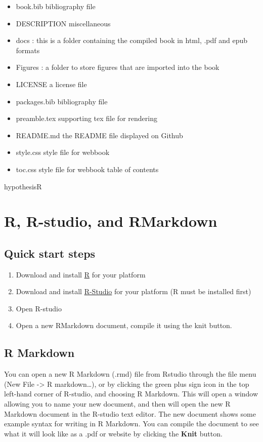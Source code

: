 \documentclass[]{book}
\providecommand{\tightlist}{%
  \setlength{\itemsep}{0pt}\setlength{\parskip}{0pt}}
\theoremstyle{definition}
\theoremstyle{definition}
\theoremstyle{definition}
\theoremstyle{remark}
\begin{document}
\begin{itemize}
\tightlist
\item
  book.bib bibliography file
\item
  DESCRIPTION miscellaneous
\item
  docs : this is a folder containing the compiled book in html, .pdf and
  epub formats
\item
  Figures : a folder to store figures that are imported into the book
\item
  LICENSE a license file
\item
  packages.bib bibliography file
\item
  preamble.tex supporting tex file for rendering
\item
  README.md the README file displayed on Github
\item
  style.css style file for webbook
\item
  toc.css style file for webbook table of contents
\end{itemize}

hypothesisR

\chapter{R, R-studio, and RMarkdown}\label{r-r-studio-and-rmarkdown}

\section{Quick start steps}\label{quick-start-steps}

\begin{enumerate}
\def\labelenumi{\arabic{enumi}.}
\tightlist
\item
  Download and install \href{https://www.r-project.org}{R} for your
  platform
\item
  Download and install \href{https://www.rstudio.com}{R-Studio} for your
  platform (R must be installed first)
\item
  Open R-studio
\item
  Open a new RMarkdown document, compile it using the knit button.
\end{enumerate}

\section{R Markdown}\label{r-markdown}

You can open a new R Markdown (.rmd) file from Rstudio through the file
menu (New File -\textgreater{} R markdown\ldots{}), or by clicking the
green plus sign icon in the top left-hand corner of R-studio, and
choosing R Markdown. This will open a window allowing you to name your
new document, and then will open the new R Markdown document in the
R-studio text editor. The new document shows some example syntax for
writing in R Markdown. You can compile the document to see what it will
look like as a .pdf or website by clicking the \textbf{Knit} button.
\end{document}
